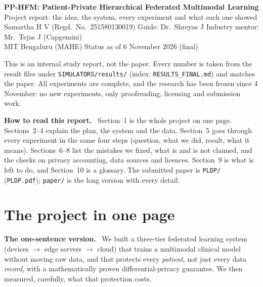 \documentclass[11pt,a4paper]{article}
\newenvironment{keybox}[1]{\par\textbf{#1.}\ }{\par}
\begin{document}
\begin{center}
{\Large\bfseries PP-HFM: Patient-Private Hierarchical Federated Multimodal Learning}\\[2pt]
Project report: the idea, the system, every experiment and what each one showed\\[2pt]
Samartha H V (Regd.\ No.\ 251580130019) \quad Guide: Dr.\ Shreyas J \quad Industry mentor: Mr.\ Tejas J (Capgemini)\\
MIT Bengaluru (MAHE) \quad Status as of 6 November 2026 (final)
\end{center}
This is an internal study report, not the paper. Every number is taken from the result files under \texttt{SIMULATORS/results/} (index: \texttt{RESULTS\_FINAL.md}) and matches the paper. All experiments are complete, and the research has been frozen since 4 November: no new experiments, only proofreading, licensing and submission work.

\begin{keybox}{How to read this report}
Section~1 is the whole project on one page. Sections~2--4 explain the plan,
the system and the data. Section~5 goes through every experiment in the same
four steps (question, what we did, result, what it means). Sections~6--8 list
the mistakes we fixed, what is and is not claimed, and the checks on privacy
accounting, data sources and licences. Section~9 is what is left to do, and
Section~10 is a glossary. The submitted paper is \texttt{PLDP/} (\texttt{PLDP.pdf});
\texttt{paper/} is the long version with every detail.
\end{keybox}

\tableofcontents
\clearpage


\section{The project in one page}

\begin{keybox}{The one-sentence version}
We built a three-tier federated learning system (devices $\rightarrow$ edge servers
$\rightarrow$ cloud) that trains a multimodal clinical model without moving raw
data, and that protects every \emph{patient}, not just every data
\emph{record}, with a mathematically proven differential-privacy guarantee. We
then measured, carefully, what that protection costs.
\end{keybox}
\end{document}
